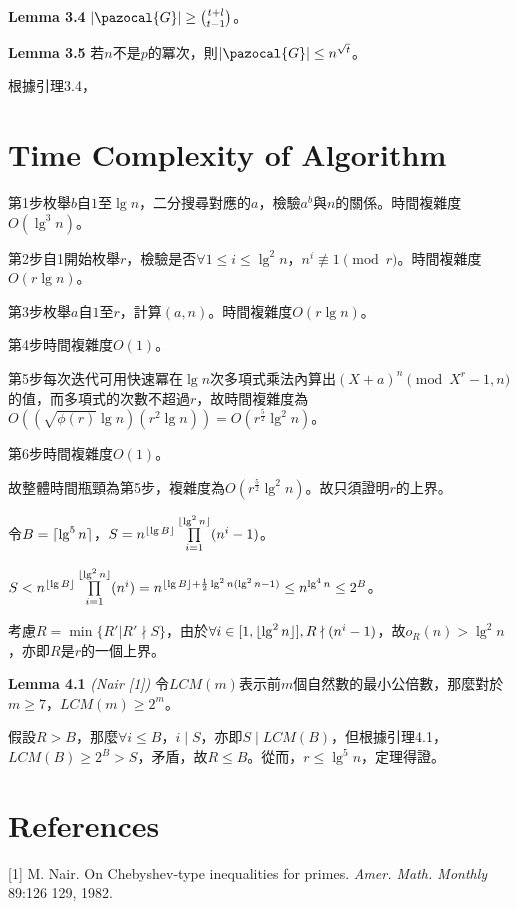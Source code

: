\documentclass{article}
\DeclarePairedDelimiter\ceil{\lceil}{\rceil}
\DeclarePairedDelimiter\floor{\lfloor}{\rfloor}
\newcommand{\nequiv}{\not\equiv}
\newcommand{\Gc}{\pazocal{G}}
\begin{document}
\begin{mdframed}
\noindent\textbf{Lemma 3.4} $|\Gc|\geq\binom{t+l}{t-1}$。
\end{mdframed}

\begin{mdframed}
\noindent\textbf{Lemma 3.5} 若$n$不是$p$的冪次，則$|\Gc|\leq n^{\sqrt{t}}$。
\end{mdframed}

    根據引理3.4，\\

\section{Time Complexity of Algorithm}

    第1步枚舉$b$自$1$至$\lg n$，二分搜尋對應的$a$，檢驗$a^b$與$n$的關係。時間複雜度$O(\lg^3n)$。

    第2步自1開始枚舉$r$，檢驗是否$\forall 1\leq i\leq\lg^2n$，$n^i\nequiv 1\pmod{r}$。時間複雜度$O(r\lg n)$。

    第3步枚舉$a$自$1$至$r$，計算$(a,n)$。時間複雜度$O(r\lg n)$。

    第4步時間複雜度$O(1)$。

    第5步每次迭代可用快速冪在$\lg n$次多項式乘法內算出$(X+a)^n\pmod{X^r-1, n}$的值，而多項式的次數不超過$r$，故時間複雜度為$O((\sqrt{\phi(r)}\lg n)(r^2\lg n))=O(r^{\frac{5}{2}}\lg^2n)$。

    第6步時間複雜度$O(1)$。

    故整體時間瓶頸為第5步，複雜度為$O(r^{\frac{5}{2}}\lg^2n)$。故只須證明$r$的上界。

    令$B=\ceil{\lg^5n}$，$S=n^{\floor{\lg B}}\prod\limits_{i=1}^{\floor{\lg^2n}}(n^i-1)$。

    $S<n^{\floor{\lg B}}\prod\limits_{i=1}^{\floor{\lg^2n}}(n^i)=n^{\floor{\lg B}+\frac{1}{2}\lg^2n(\lg^2n-1)}\leq n^{\lg^4n}\leq 2^B$。

    考慮$R=\min\{R'|R'\nmid S\}$，由於$\forall i\in[1, \floor{\lg^2n}], R\nmid(n^i-1)$，故$o_R(n)>\lg^2n$，亦即$R$是$r$的一個上界。

\begin{mdframed}
\noindent\textbf{Lemma 4.1} \textit{(Nair [1])} 令$LCM(m)$表示前$m$個自然數的最小公倍數，那麼對於$m\geq 7$，$LCM(m)\geq 2^m$。
\end{mdframed}

    假設$R>B$，那麼$\forall i\leq B$，$i\mid S$，亦即$S\mid LCM(B)$，但根據引理4.1，$LCM(B)\geq 2^B>S$，矛盾，故$R\leq B$。從而，$r\leq \lg^5n$，定理得證。

\section{References}

    [1] M. Nair. On Chebyshev-type inequalities for primes. \textit{Amer. Math. Monthly} 89:126 129, 1982.
    
\end{document}
